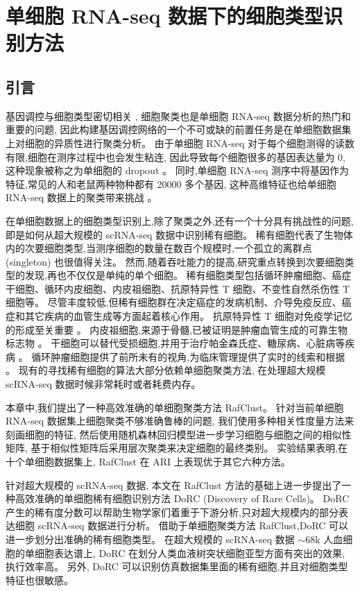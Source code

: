 \section{单细胞 RNA-seq 数据下的细胞类型识别方法}
\label{sec:rafclust}

\subsection{引言}

基因调控与细胞类型密切相关 \cite{Hocker2020.09.11.291724,kang2020learning},
细胞聚类也是单细胞 RNA-seq 数据分析的热门和重要的问题, 
因此构建基因调控网络的一个不可或缺的前置任务是在单细胞数据集上对细胞的异质性进行聚类分析。
由于单细胞 RNA-seq 对于每个细胞测得的读数有限,细胞在测序过程中也会发生粘连,
因此导致每个细胞很多的基因表达量为 0,
这种现象被称之为单细胞的 dropout \cite{vallejos2017normalizing}。
同时,单细胞 RNA-seq 测序中将基因作为特征,常见的人和老鼠两种物种都有 20000 多个基因,
这种高维特征也给单细胞 RNA-seq 数据上的聚类带来挑战 \cite{stegle2015computational}。

在单细胞数据上的细胞类型识别上,除了聚类之外,还有一个十分具有挑战性的问题,即是如何从超大规模的 scRNA-seq 数据中识别稀有细胞。
稀有细胞代表了生物体内的次要细胞类型,当测序细胞的数量在数百个规模时,一个孤立的离群点 (singleton) 也很值得关注。
然而,随着吞吐能力的提高,研究重点转换到次要细胞类型的发现,再也不仅仅是单纯的单个细胞。
稀有细胞类型包括循环肿瘤细胞、癌症干细胞、循环内皮细胞、内皮祖细胞、抗原特异性 T 细胞、不变性自然杀伤性 T 细胞等。
尽管丰度较低,但稀有细胞群在决定癌症的发病机制、介导免疫反应、癌症和其它疾病的血管生成等方面起着核心作用。
抗原特异性 T 细胞对免疫学记忆的形成至关重要 \cite{slansky2003antigen,altman1996phenotypic,manzo2015antigen}。
内皮祖细胞,来源于骨髓,已被证明是肿瘤血管生成的可靠生物标志物 \cite{kuo2012dynamics,cima2016tumor}。
干细胞可以替代受损细胞,并用于治疗帕金森氏症、糖尿病、心脏病等疾病 \cite{jang2005stem}。
循环肿瘤细胞提供了前所未有的视角,为临床管理提供了实时的线索和根据 \cite{krebs2010circulating}。
现有的寻找稀有细胞的算法大部分依赖单细胞聚类方法,
在处理超大规模 scRNA-seq 数据时候非常耗时或者耗费内存。

本章中,我们提出了一种高效准确的单细胞聚类方法 RafClust。
针对当前单细胞 RNA-seq 数据集上细胞聚类不够准确鲁棒的问题,
我们使用多种相关性度量方法来刻画细胞的特征, 
然后使用随机森林回归模型进一步学习细胞与细胞之间的相似性矩阵,
基于相似性矩阵后采用层次聚类来决定细胞的最终类别。
实验结果表明,在十个单细胞数据集上, RafClust 在 ARI 上表现优于其它六种方法。

针对超大规模的 scRNA-seq 数据, 本文在 RafClust 方法的基础上进一步提出了一种高效准确的单细胞稀有细胞识别方法 DoRC (Discovery of Rare Cells)。
DoRC 产生的稀有度分数可以帮助生物学家们着重于下游分析,只对超大规模内的部分表达细胞 scRNA-seq 数据进行分析。
借助于单细胞聚类方法 RafClust,DoRC 可以进一步划分出准确的稀有细胞类型。
在超大规模的 scRNA-seq 数据 ${\sim}68$k 人血细胞的单细胞表达谱上,
 DoRC 在划分人类血液树突状细胞亚型方面有突出的效果, 执行效率高。
另外, DoRC 可以识别仿真数据集里面的稀有细胞,并且对细胞类型特征也很敏感。

